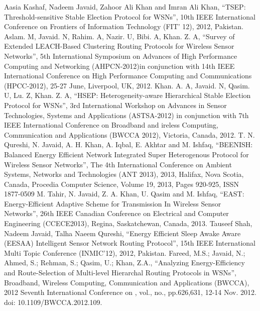 \documentclass[10pt, conference, compsocconf]{IEEEtran}
\begin{document}
\begin{thebibliography}{1}
Aasia Kashaf, Nadeem Javaid, Zahoor Ali Khan and Imran Ali Khan, ``TSEP: Threshold-sensitive Stable Election Protocol for WSNs'', 10th IEEE International Conference on Frontiers of Information Technology (FIT' 12), 2012, Pakistan.
Aslam. M, Javaid. N, Rahim. A, Nazir. U, Bibi. A, Khan. Z. A, ``Survey of Extended LEACH-Based Clustering Routing Protocols for Wireless Sensor Networks'', 5th International Symposium on Advances of High Performance Computing and Networking (AHPCN-2012)in conjunction with 14th IEEE International Conference on High Performance Computing and Communications (HPCC-2012), 25-27 June, Liverpool, UK, 2012.
Khan. A. A, Javaid. N, Qasim. U, Lu. Z, Khan. Z. A, ``HSEP: Heterogeneity-aware Hierarchical Stable Election Protocol for WSNs'', 3rd International Workshop on Advances in Sensor Technologies, Systems and Applications (ASTSA-2012) in conjunction with 7th IEEE International Conference on Broadband and ireless Computing, Communication and Applications (BWCCA 2012), Victoria, Canada, 2012.
T. N. Qureshi, N. Javaid, A. H. Khan, A. Iqbal, E. Akhtar and M. Ishfaq, ``BEENISH: Balanced Energy Efficient Network Integrated Super Heterogenous Protocol for Wireless Sensor Networks'', The 4th International Conference on Ambient Systems, Networks and Technologies (ANT 2013), 2013, Halifax, Nova Scotia, Canada, Procedia Computer Science, Volume 19, 2013, Pages 920-925, ISSN 1877-0509
M. Tahir, N. Javaid, Z. A. Khan, U. Qasim and M. Ishfaq, ``EAST: Energy-Efficient Adaptive Scheme for Transmission In Wireless Sensor Networks'', 26th IEEE Canadian Conference on Electrical and Computer Engineering (CCECE2013), Regina, Saskatchewan, Canada, 2013.
Tauseef Shah, Nadeem Javaid, Talha Naeem Qureshi, ``Energy Efficient Sleep Awake Aware (EESAA) Intelligent Sensor Network Routing Protocol'', 15th IEEE International Multi Topic Conference (INMIC'12), 2012, Pakistan.
Fareed, M.S.; Javaid, N.; Ahmed, S.; Rehman, S.; Qasim, U.; Khan, Z.A., ``Analyzing Energy-Efficiency and Route-Selection of Multi-level Hierarchal Routing Protocols in WSNs'', Broadband, Wireless Computing, Communication and Applications (BWCCA), 2012 Seventh International Conference on , vol., no., pp.626,631, 12-14 Nov. 2012. doi: 10.1109/BWCCA.2012.109.

\end{thebibliography}
\end{document}
